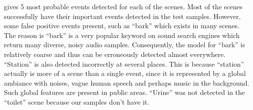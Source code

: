  gives 5 most probable
events detected for each of the scenes. Most of the scenes successfully
have their important events detected in the test samples. However,
some false positive events present, such as ``bark'' which exists in many
scenes. The reason is ``bark'' is a very popular keyword on sound search
engines which return many diverse, noisy audio samples. Consequently,
the model for ``bark'' is relatively coarse and thus can be erroneously
detected almost everywhere. ``Station'' is also detected incorrectly
at several places. This is because ``station'' actually is more of a scene
than a single event, since it is represented by a global ambiance with
noises, vague human speech and perhaps music in the background. Such global
features are present in public areas. ``Urine'' was not detected in the
``toilet'' scene because our samples don't have it.
%

